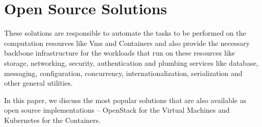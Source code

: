 \section{Open Source Solutions}

These solutions are responsible to automate the tasks to be performed on the computation resources like Vms and Containers and also provide the necessary backbone infrastructure for the workloads that run on these resources like storage, networking, security, authentication and plumbing services like database, messaging, configuration, concurrency, internationalization, serialization and other general utilities.

In this paper, we discuss the most popular solutions that are also available as open source implementations – OpenStack for the Virtual Machines and Kubernetes for the Containers.
